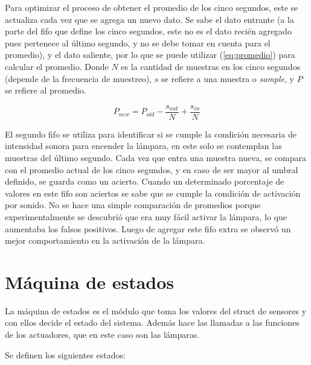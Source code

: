 Para optimizar el proceso de obtener el promedio de los cinco segundos, este se
actualiza cada vez que se agrega un nuevo dato. Se sabe el dato entrante (a la parte del fifo que
define los cinco segundos, este no es el dato recién agregado pues pertenece al último segundo, y
no se debe tomar en cuenta para el promedio), y el dato saliente, por lo que se puede utilizar
(\ref{eq:promedio}) para calcular el promedio. Donde $N$ es la cantidad de muestras en los cinco
segundos (depende de la frecuencia de muestreo), $s$ se refiere a una muestra o \textit{sample}, y
$P$ se refiere al promedio.

\begin{equation}
  P_{new} = P_{old}-\frac{s_{out}}{N}+\frac{s_{in}}{N}
\end{equation}

El segundo fifo se utiliza para identificar si se cumple la condición necesaria de intensidad sonora
para encender la lámpara, en este solo se contemplan las muestras del último segundo.  Cada vez que
entra una muestra nueva, se compara con el promedio actual de los cinco segundos, y en caso de ser
mayor al umbral definido, se guarda como un acierto. Cuando un determinado porcentaje de valores en
este fifo son aciertos se sabe que se cumple la condición de activación por sonido. No se
hace una simple comparación de promedios porque experimentalmente se descubrió que era muy fácil
activar la lámpara, lo que aumentaba los falsos positivos. Luego de agregar este fifo extra se
observó un mejor comportamiento en la activación de la lámpara.

\section{Máquina de estados}

La máquina de estados es el módulo que toma los valores del struct de sensores y con ellos decide el
estado del sistema. Además hace las llamadas a las funciones de los actuadores, que en este caso son
las lámparas. 

Se definen los siguientes estados:

